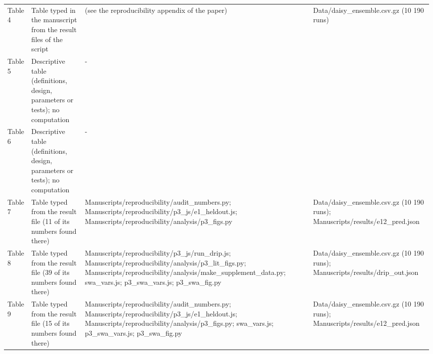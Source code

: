 {\begin{longtable}{p{}p{}p{}p{}}
{}Table 4 & Table typed in the manuscript from the result files of the script & (see the reproducibility appendix of the paper) & Data/\allowbreak{}daisy\_\allowbreak{}ensemble.csv.gz (10 190 runs)\\
{}Table 5 & Descriptive table (definitions, design, parameters or tests); no computation & - & \\
{}Table 6 & Descriptive table (definitions, design, parameters or tests); no computation & - & \\
{}Table 7 & Table typed from the result file (11 of its numbers found there) & Manuscripts/\allowbreak{}reproducibility/\allowbreak{}audit\_\allowbreak{}numbers.py;  Manuscripts/\allowbreak{}reproducibility/\allowbreak{}p3\_\allowbreak{}js/\allowbreak{}e1\_\allowbreak{}heldout.js;  Manuscripts/\allowbreak{}reproducibility/\allowbreak{}analysis/\allowbreak{}p3\_\allowbreak{}figs.py & Data/\allowbreak{}daisy\_\allowbreak{}ensemble.csv.gz (10 190 runs);  Manuscripts/\allowbreak{}results/\allowbreak{}e12\_\allowbreak{}pred.json\\
{}Table 8 & Table typed from the result file (39 of its numbers found there) & Manuscripts/\allowbreak{}reproducibility/\allowbreak{}p3\_\allowbreak{}js/\allowbreak{}run\_\allowbreak{}drip.js;  Manuscripts/\allowbreak{}reproducibility/\allowbreak{}analysis/\allowbreak{}p3\_\allowbreak{}lit\_\allowbreak{}figs.py;  Manuscripts/\allowbreak{}reproducibility/\allowbreak{}analysis/\allowbreak{}make\_\allowbreak{}supplement\_\allowbreak{}data.py;  swa\_\allowbreak{}vars.js;  p3\_\allowbreak{}swa\_\allowbreak{}vars.js;  p3\_\allowbreak{}swa\_\allowbreak{}fig.py & Data/\allowbreak{}daisy\_\allowbreak{}ensemble.csv.gz (10 190 runs);  Manuscripts/\allowbreak{}results/\allowbreak{}drip\_\allowbreak{}out.json\\
{}Table 9 & Table typed from the result file (15 of its numbers found there) & Manuscripts/\allowbreak{}reproducibility/\allowbreak{}audit\_\allowbreak{}numbers.py;  Manuscripts/\allowbreak{}reproducibility/\allowbreak{}p3\_\allowbreak{}js/\allowbreak{}e1\_\allowbreak{}heldout.js;  Manuscripts/\allowbreak{}reproducibility/\allowbreak{}analysis/\allowbreak{}p3\_\allowbreak{}figs.py;  swa\_\allowbreak{}vars.js;  p3\_\allowbreak{}swa\_\allowbreak{}vars.js;  p3\_\allowbreak{}swa\_\allowbreak{}fig.py & Data/\allowbreak{}daisy\_\allowbreak{}ensemble.csv.gz (10 190 runs);  Manuscripts/\allowbreak{}results/\allowbreak{}e12\_\allowbreak{}pred.json\\

\end{longtable}}
